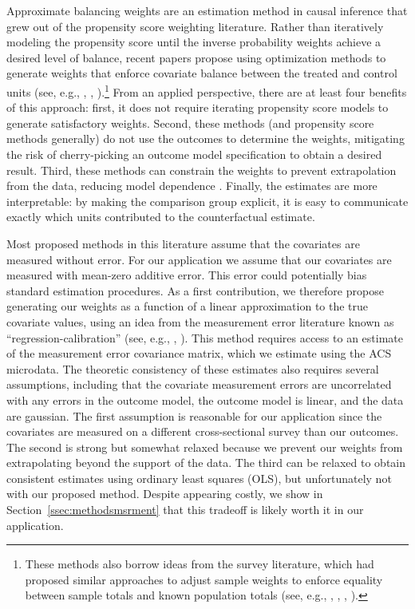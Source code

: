 \documentclass[aoas]{imsart}
\theoremstyle{plain}
\theoremstyle{remark}
\begin{document}
Approximate balancing weights are an estimation method in causal inference that grew out of the propensity score weighting literature. Rather than iteratively modeling the propensity score until the inverse probability weights achieve a desired level of balance, recent papers propose using optimization methods to generate weights that enforce covariate balance between the treated and control units (see, e.g., \cite{hainmueller2012entropy}, \cite{imai2014covariate}, \cite{zubizarreta2015stable}).\footnote{These methods also borrow ideas from the survey literature, which had proposed similar approaches to adjust sample weights to enforce equality between sample totals and known population totals (see, e.g., \cite{haberman1984adjustment}, \cite{deville1992calibration}, \cite{deville1993generalized}, \cite{sarndal2005estimation}).} From an applied perspective, there are at least four benefits of this approach: first, it does not require iterating propensity score models to generate satisfactory weights. Second, these methods (and propensity score methods generally) do not use the outcomes to determine the weights, mitigating the risk of cherry-picking an outcome model specification to obtain a desired result. Third, these methods can constrain the weights to prevent extrapolation from the data, reducing model dependence \cite{zubizarreta2015stable}. Finally, the estimates are more interpretable: by making the comparison group explicit, it is easy to communicate exactly which units contributed to the counterfactual estimate.

Most proposed methods in this literature assume that the covariates are measured without error. For our application we assume that our covariates are measured with mean-zero additive error. This error could potentially bias standard estimation procedures. As a first contribution, we therefore propose generating our weights as a function of a linear approximation to the true covariate values, using an idea from the measurement error literature known as ``regression-calibration'' (see, e.g., \cite{carroll2006measurement}, \cite{gleser1992importance}). This method requires access to an estimate of the measurement error covariance matrix, which we estimate using the ACS microdata. The theoretic consistency of these estimates also requires several assumptions, including that the covariate measurement errors are uncorrelated with any errors in the outcome model, the outcome model is linear, and the data are gaussian. The first assumption is reasonable for our application since the covariates are measured on a different cross-sectional survey than our outcomes. The second is strong but somewhat relaxed because we prevent our weights from extrapolating beyond the support of the data. The third can be relaxed to obtain consistent estimates using ordinary least squares (OLS), but unfortunately not with our proposed method. Despite appearing costly, we show in Section~\ref{ssec:methodsmsrment} that this tradeoff is likely worth it in our application.
\end{document}
